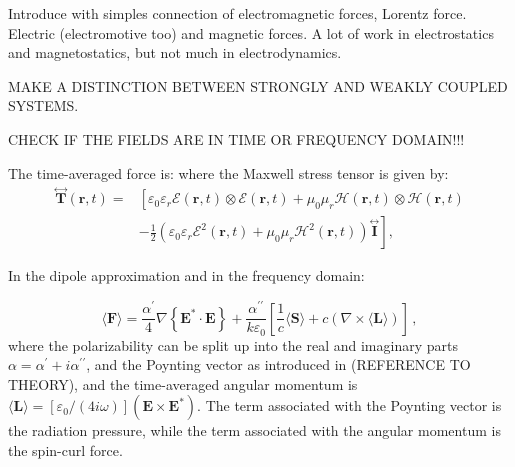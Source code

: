 Introduce with simples connection of electromagnetic forces, Lorentz force. Electric (electromotive too) and 
magnetic forces. A lot of work in electrostatics and magnetostatics, but not much in
electrodynamics.

MAKE A DISTINCTION BETWEEN STRONGLY AND WEAKLY COUPLED SYSTEMS.

CHECK IF THE FIELDS ARE IN TIME OR FREQUENCY DOMAIN!!!

The time-averaged force is:
where the Maxwell stress tensor is given by:
\begin{equation}
    \begin{aligned}
    \stackrel{\leftrightarrow}{\mathbf{T}}(\mathbf{r}, t)= & {\left[\varepsilon_0 \varepsilon_r \mathcal{E}(\mathbf{r}, t) \otimes \mathcal{E}(\mathbf{r}, t)+\mu_0 \mu_r \mathcal{H}(\mathbf{r}, t) \otimes \mathcal{H}(\mathbf{r}, t)\right.} \\
    & \left.-\frac{1}{2}\left(\varepsilon_0 \varepsilon_r \mathcal{E}^2(\mathbf{r}, t)+\mu_0 \mu_r \mathcal{H}^2(\mathbf{r}, t)\right) \stackrel{\leftrightarrow}{\mathbf{I}}\right],
    \end{aligned}
\end{equation}

In the dipole approximation and in the frequency domain:

\begin{equation}
    \langle\mathbf{F}\rangle=\frac{\alpha^{\prime}}{4} \nabla\left\{\mathbf{E}^* \cdot \mathbf{E}\right\}
    +\frac{\alpha^{\prime \prime}}{k \varepsilon_0} \left[\frac{1}{c}\langle \mathbf{S} \rangle + c \left( \nabla \times \langle \mathbf{L} \rangle \right)\right]\,,
\end{equation}
where the polarizability can be split up into the real and imaginary parts 
$\alpha=\alpha^\prime + i \alpha^{\prime \prime}$, and the Poynting vector as introduced in 
(REFERENCE TO THEORY), and the time-averaged angular momentum is 
$\langle \mathbf{L} \rangle = [\varepsilon_0/(4 i \omega)](\mathbf{E} \times \mathbf{E}^*)$. 
The term associated with the Poynting vector is the radiation pressure, while the term associated 
with the angular momentum is the spin-curl force.

